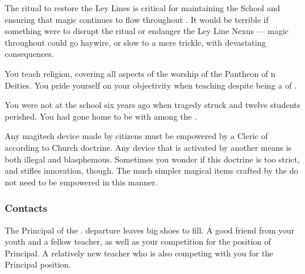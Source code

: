 \documentclass[char]{GL2020}
\begin{document}
\begin{itemz}[Notes]
    \item The ritual to restore the Ley Lines is critical for maintaining the School and ensuring that magic continues to flow throughout \pEarth{}. It would be terrible if something were to disrupt the ritual or endanger the Ley Line Nexus — magic throughout \pEarth{} could go haywire, or slow to a mere trickle, with devastating consequences. 
    \item You teach religion, covering all aspects of the worship of the Pantheon of \pEarth{}n Deities. You pride yourself on your objectivity when teaching despite being a \cBeetle{\cleric} of \cTechGod{}.
    \item You were not at the school six years ago when tragedy struck and twelve students perished. You had gone home to be with \cJuniorStatesman{} among the \pShip{}.
    \item Any magitech device made by \pTech{} citizens must be empowered by a Cleric of \cTechGod{} according to Church doctrine. Any device that is activated by another means is both illegal and blasphemous. Sometimes you wonder if this doctrine is too strict, and stifles innovation, though. The much simpler magical items crafted by the \pShippies{} do not need to be empowered in this manner.
\end{itemz}

\subsubsection*{Contacts}
\begin{contacts}
    \contact{\cPrincipal{}} The Principal of the \pSchool{}. \cPrincipal{\Their} departure leaves big shoes to fill.
    \contact{\cMusic{}} A good friend from your youth and a fellow teacher, as well as your competition for the position of Principal.
    \contact{\cChupSecond{}} A relatively new teacher who is also competing with you for the Principal position. 
\end{contacts}
\end{document}

